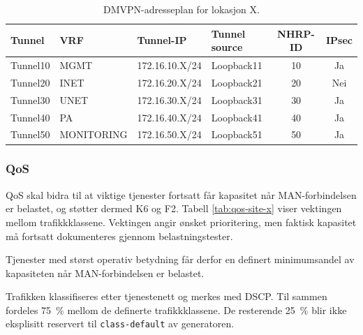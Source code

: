 \begin{table}[H]
    \centering
    \caption{DMVPN-adresseplan for lokasjon X.}
    \label{tab:dmvpn-site-x}
    \small
    \renewcommand{\arraystretch}{1.3}
    \setlength{\tabcolsep}{5pt}
    \begin{tabular}{llllcc}
        \toprule
        \rowcolor{tablegreen}
        \color{white}\textbf{Tunnel} &
        \color{white}\textbf{VRF} &
        \color{white}\textbf{Tunnel-IP} &
        \color{white}\textbf{Tunnel source} &
        \color{white}\textbf{NHRP-ID} &
        \color{white}\textbf{IPsec} \\
        \midrule
        Tunnel10 & MGMT       & 172.16.10.X/24 & Loopback11 & 10 & Ja \\
        Tunnel20 & INET       & 172.16.20.X/24 & Loopback21 & 20 & Nei \\
        Tunnel30 & UNET       & 172.16.30.X/24 & Loopback31 & 30 & Ja \\
        Tunnel40 & PA         & 172.16.40.X/24 & Loopback41 & 40 & Ja \\
        Tunnel50 & MONITORING & 172.16.50.X/24 & Loopback51 & 50 & Ja \\
        \bottomrule
    \end{tabular}
\end{table}

\subsubsection{QoS}
QoS skal bidra til at viktige tjenester fortsatt får kapasitet når MAN-forbindelsen er belastet, og støtter dermed K6 og F2. Tabell \ref{tab:qos-site-x} viser vektingen mellom trafikkklassene. Vektingen angir ønsket prioritering, men faktisk kapasitet må fortsatt dokumenteres gjennom belastningstester.

Tjenester med størst operativ betydning får derfor en definert minimumsandel av kapasiteten når MAN-forbindelsen er belastet.

Trafikken klassifiseres etter tjenestenett og merkes med DSCP. Til sammen fordeles 75~\% mellom de definerte trafikkklassene. De resterende 25~\% blir ikke eksplisitt reservert til \texttt{class-default} av generatoren.

